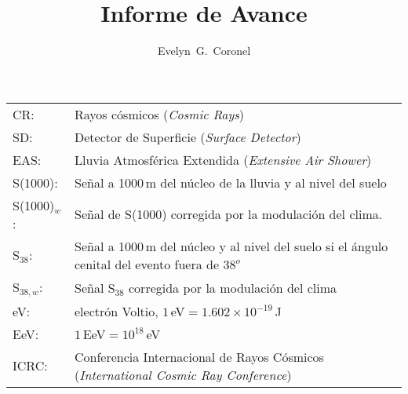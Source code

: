 \documentclass{ibtesis}
\title{Informe de Avance}
\author{Evelyn~G.~Coronel}
\begin{document}
\begin{preliminary}


\begin{abreviaturas}

\begin{tabular}{l l}
CR: 		& Rayos cósmicos  (\emph{Cosmic Rays}) \\
SD: 		& Detector de Superficie (\emph{Surface Detector})  \\
EAS: 		& Lluvia Atmosférica Extendida  (\emph{Extensive Air Shower})    \\
S(1000): 	& Señal a 1000\,m del núcleo de la lluvia y al nivel del suelo \\
S(1000)$_w$:& Señal de S(1000) corregida por la modulación del clima. \\
S$_{38}$: 	& Señal a 1000\,m del núcleo y al nivel del suelo si el ángulo cenital del evento fuera de $38^o$\\
S$_{38,w}$: & Señal S$_{38}$ corregida por la modulación del clima \\
eV: 		& electrón Voltio, $1\,$eV$= 1.602\times 10^{-19}\,$J \\
EeV: 		& $1\,$EeV$=10^{18}\,$eV\\
ICRC: 		& Conferencia Internacional de Rayos Cósmicos (\emph{International Cosmic Ray Conference})\\
\end{tabular}
\end{abreviaturas}

	\tableofcontents                %
	\listoffigures                  %


\end{preliminary}
\end{document}

